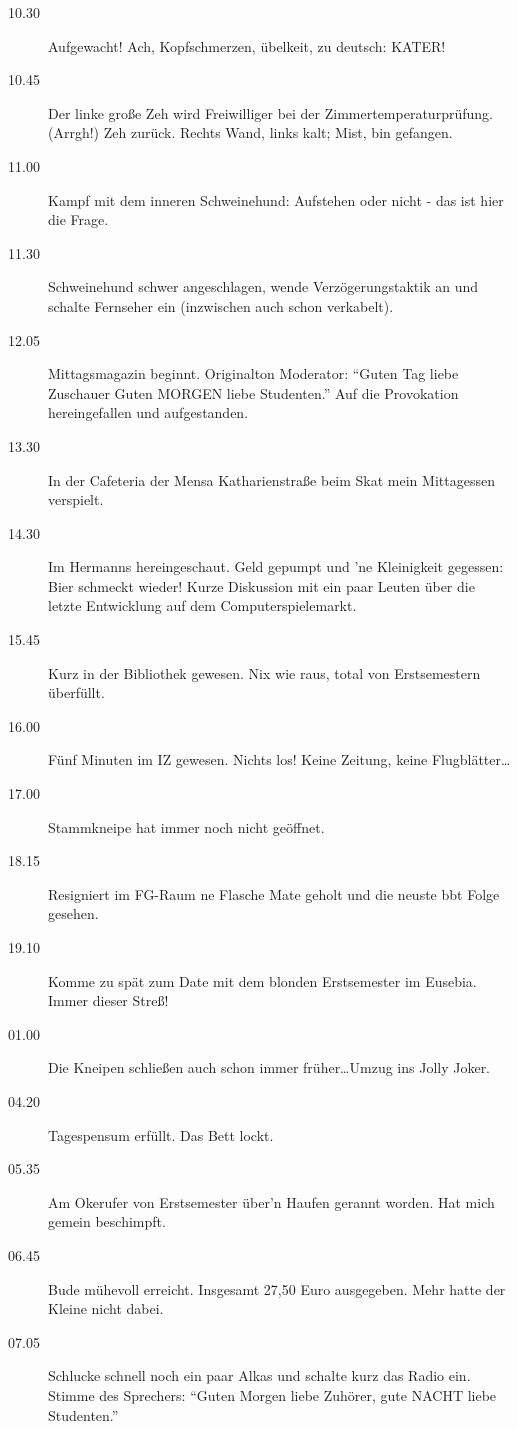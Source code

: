 \begin{description}
\item[10.30] Aufgewacht! Ach, Kopfschmerzen, übelkeit, zu deutsch: KATER!
\item[10.45] Der linke große Zeh wird Freiwilliger bei der Zimmertemperaturprüfung.
(Arrgh!) Zeh zurück. Rechts Wand, links kalt; Mist, bin gefangen.
\item[11.00] Kampf mit dem inneren Schweinehund: Aufstehen oder nicht - das ist
hier die Frage.
\item[11.30] Schweinehund schwer angeschlagen, wende Verzögerungstaktik an und
schalte Fernseher ein (inzwischen auch schon verkabelt).
\item[12.05] Mittagsmagazin beginnt. Originalton Moderator: "`Guten Tag liebe
Zuschauer Guten MORGEN liebe Studenten."' Auf die Provokation hereingefallen
und aufgestanden.
\item[13.30] In der Cafeteria der Mensa Katharienstraße beim Skat mein Mittagessen
verspielt.
\item[14.30] Im Hermanns hereingeschaut. Geld gepumpt und 'ne Kleinigkeit
gegessen: Bier schmeckt wieder! Kurze Diskussion mit ein paar Leuten über
die letzte Entwicklung auf dem Computerspielemarkt.
\item[15.45] Kurz in der Bibliothek gewesen. Nix wie raus, total von Erstsemestern
überfüllt.
\item[16.00] Fünf Minuten im IZ gewesen. Nichts los! Keine Zeitung, keine
Flugblätter\ldots
\item[17.00] Stammkneipe hat immer noch nicht geöffnet.
\item[18.15] Resigniert im FG-Raum ne Flasche Mate geholt und die neuste bbt Folge gesehen.
\item[19.10] Komme zu spät zum Date mit dem blonden Erstsemester im Eusebia.
Immer dieser Streß!
\item[01.00] Die Kneipen schließen auch schon immer früher\ldots Umzug ins Jolly Joker.
\item[04.20] Tagespensum erfüllt. Das Bett lockt.
\item[05.35] Am Okerufer von Erstsemester über'n Haufen gerannt worden. Hat mich
gemein beschimpft.
\item[06.45] Bude mühevoll erreicht. Insgesamt 27,50 Euro ausgegeben. Mehr hatte der
Kleine nicht dabei.
\item[07.05] Schlucke schnell noch ein paar Alkas und schalte kurz das Radio ein.
Stimme des Sprechers: "`Guten Morgen liebe Zuhörer, gute NACHT liebe
Studenten."'
\end{description}
